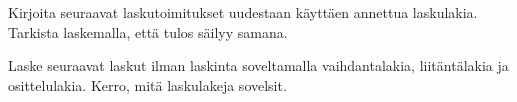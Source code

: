 \begin{tehtavasivu}

\begin{tehtava}
Kirjoita seuraavat laskutoimitukset uudestaan käyttäen annettua laskulakia. 
    Tarkista laskemalla, että tulos säilyy samana.

    \begin{alakohdat}
    \end{alakohdat}
    \begin{vastaus}
	\begin{alakohdat}
	\end{alakohdat}
    \end{vastaus}
\end{tehtava}

\begin{tehtava}
Laske seuraavat laskut ilman laskinta soveltamalla vaihdantalakia, liitäntälakia ja osittelulakia.
Kerro, mitä laskulakeja sovelsit.


\end{tehtava}
\end{tehtavasivu}
